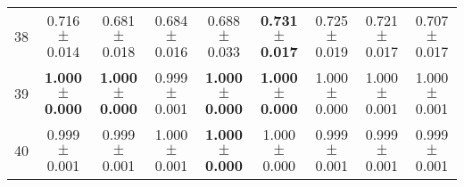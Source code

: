 \begin{table}[!ht]
{\begin{tabular}{r c c c c c c c c}
38 & 0.716 $\pm$ 0.014 & 0.681 $\pm$ 0.018 & 0.684 $\pm$ 0.016 & 0.688 $\pm$ 0.033 & \textbf{0.731 $\pm$ 0.017} & 0.725 $\pm$ 0.019 & 0.721 $\pm$ 0.017 & 0.707 $\pm$ 0.017 \\
39 & \textbf{1.000 $\pm$ 0.000} & \textbf{1.000 $\pm$ 0.000} & 0.999 $\pm$ 0.001 & \textbf{1.000 $\pm$ 0.000} & \textbf{1.000 $\pm$ 0.000} & 1.000 $\pm$ 0.000 & 1.000 $\pm$ 0.001 & 1.000 $\pm$ 0.001 \\
40 & 0.999 $\pm$ 0.001 & 0.999 $\pm$ 0.001 & 1.000 $\pm$ 0.001 & \textbf{1.000 $\pm$ 0.000} & 1.000 $\pm$ 0.000 & 0.999 $\pm$ 0.001 & 0.999 $\pm$ 0.001 & 0.999 $\pm$ 0.001 \\
\end{tabular}}
\end{table}
